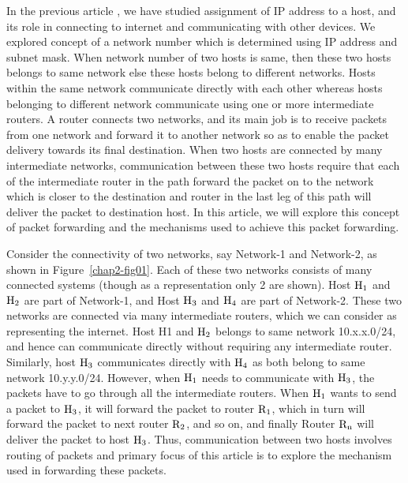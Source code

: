 \begin{multicols}{2}

In the previous article \cite{art2-key01}, we have studied assignment of IP address \cite{art2-key02} to a host, and its role in connecting to internet and communicating with other devices. We explored concept of a network number which is determined using IP address and subnet mask. When network number of two hosts is same, then these two hosts belongs to same network else these hosts belong to different networks. Hosts within the same network communicate directly with each other whereas hosts belonging to different network communicate using one or more intermediate routers. A router connects two networks, and its main job is to receive packets from one network and forward it to another network so as to enable the packet delivery towards its final destination. When two hosts are connected by many intermediate networks, communication between these two hosts require that each of the intermediate router in the path forward the packet on to the network which is closer to the destination and router in the last leg of this path will deliver the packet to destination host. In this article, we will explore this concept of packet forwarding and the mechanisms used to achieve this packet forwarding.

Consider the connectivity of two networks, say Network-1 and Network-2, as shown in Figure~\ref{chap2-fig01}. Each of these two networks consists of many connected systems (though as a representation only 2 are shown). Host ${\rm H}_1$ and ${\rm H}_2$ are part of Network-1, and Host ${\rm H}_3$ and ${\rm H}_4$ are part of Network-2. These two networks are connected via many intermediate routers, which we can consider as representing the internet. Host H1 and ${\rm H}_2$ belongs to same network 10.x.x.0/24, and hence can communicate directly without requiring any intermediate router. Similarly, host ${\rm H}_3$ communicates directly with ${\rm H}_4$ as both belong to same network 10.y.y.0/24. However, when ${\rm H}_1$ needs to communicate with ${\rm H}_3$, the packets have to go through all the intermediate routers. When ${\rm H}_1$ wants to send a packet to ${\rm H}_3$, it will forward the packet to router ${\rm R}_1$, which in turn will forward the packet to next router ${\rm R}_2$, and so on, and finally Router ${\rm R}_{\rm n}$ will deliver the packet to host ${\rm H}_3$. Thus, communication between two hosts involves routing of packets and primary focus of this article is to explore the mechanism used in forwarding these packets.
\end{multicols}

